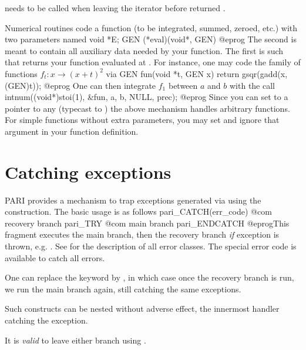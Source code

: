  needs to be called when leaving the
iterator before  returned .


Numerical routines code a function (to be integrated, summed, zeroed, etc.)
with two parameters named
\bprog
  void *E;
  GEN (*eval)(void*, GEN)
@eprog\noindent
The second is meant to contain all auxiliary data needed by your function.
The first is such that  returns your function evaluated at
. For instance, one may code the family of functions
$f_t: x \to (x+t)^2$ via
\bprog
GEN fun(void *t, GEN x) { return gsqr(gadd(x, (GEN)t)); }
@eprog\noindent
One can then integrate $f_1$ between $a$ and $b$ with the call
\bprog
intnum((void*)stoi(1), &fun, a, b, NULL, prec);
@eprog\noindent
Since you can set  to a pointer to any  (typecast to
) the above mechanism handles arbitrary functions. For simple
functions without extra parameters, you may set  and ignore
that argument in your function definition.

\section{Catching exceptions}


PARI provides a mechanism to trap exceptions generated via 
using the  construction. The basic usage is as follows
\bprog
 pari_CATCH(err_code) {
   @com recovery branch
 }
 pari_TRY {
   @com main branch
 }
 pari_ENDCATCH
@eprog\noindent This fragment executes the main branch, then the recovery
branch \emph{if} exception  is thrown, e.g. .
See  for the description of all error classes.
The special error code  is available to catch all errors.

One can replace the  keyword by , in which case
once the recovery branch is run, we run the main branch again, still catching
the same exceptions.


\item Such constructs can be nested without adverse effect, the innermost
handler catching the exception.

\item It is \emph{valid} to leave either branch using .

